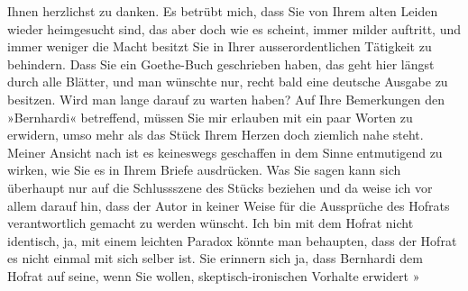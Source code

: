 \begin{ledgroupsized}[t]{13cm}
               Ihnen herzlichst zu danken. Es betrübt mich, dass Sie von Ihrem alten Leiden wieder
               heimgesucht sind, das aber doch wie es scheint, immer milder auftritt, und immer
               weniger die Macht besitzt Sie in Ihrer ausserordentlichen Tätigkeit zu behindern.
               Dass Sie ein Goethe-Buch geschrieben haben, das geht
               hier längst durch alle Blätter, und man wünschte nur, recht bald eine deutsche
               Ausgabe zu besitzen. Wird man lange darauf zu warten haben?\pend
           \pstart
           Auf Ihre Bemerkungen den »Bernhardi« betreffend,
               müssen Sie mir erlauben mit ein paar Worten zu erwidern, umso mehr als das Stück
               Ihrem Herzen doch ziemlich nahe steht. Meiner Ansicht nach ist es keineswegs
               geschaffen in {\pb}dem Sinne entmutigend zu wirken,
               wie Sie es in Ihrem Briefe ausdrücken. Was Sie sagen kann sich überhaupt nur auf die
               Schlussszene des Stücks beziehen und da weise ich vor allem darauf hin, dass der
               Autor in keiner Weise für die Aussprüche des Hofrats verantwortlich gemacht zu werden
               wünscht. Ich bin mit dem Hofrat nicht identisch, ja, mit einem leichten Paradox
               könnte man behaupten, dass der Hofrat es nicht einmal mit sich selber ist. Sie
               erinnern sich ja, dass Bernhardi
               dem Hofrat auf seine, wenn Sie wollen, skeptisch-ironischen Vorhalte erwidert \introOben{}»\introOben{}\label{K_L02222_1v}
\end{ledgroupsized}
